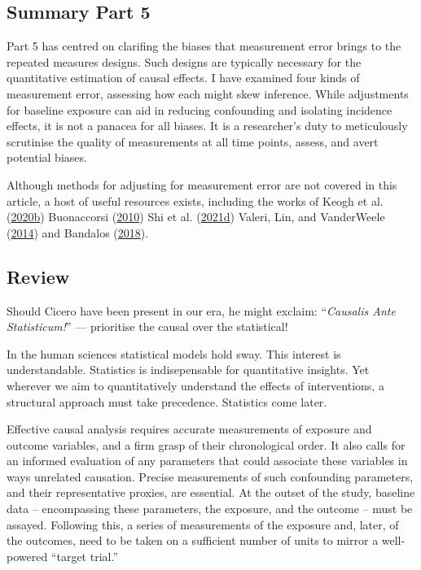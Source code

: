 \documentclass[
  singlecolumn]{report}
\begin{document}
\hypertarget{summary-part-5}{%
\subsection{Summary Part 5}\label{summary-part-5}}

Part 5 has centred on clarifing the biases that measurement error brings
to the repeated measures designs. Such designs are typically necessary
for the quantitative estimation of causal effects. I have examined four
kinds of measurement error, assessing how each might skew inference.
While adjustments for baseline exposure can aid in reducing confounding
and isolating incidence effects, it is not a panacea for all biases. It
is a researcher's duty to meticulously scrutinise the quality of
measurements at all time points, assess, and avert potential biases.

Although methods for adjusting for measurement error are not covered in
this article, a host of useful resources exists, including the works of
Keogh et al. (\protect\hyperlink{ref-keogh2020}{2020b}) Buonaccorsi
(\protect\hyperlink{ref-buonaccorsi2010}{2010}) Shi et al.
(\protect\hyperlink{ref-shi2021b}{2021d}) Valeri, Lin, and VanderWeele
(\protect\hyperlink{ref-valeri2014}{2014}) and Bandalos
(\protect\hyperlink{ref-bandalos2018}{2018}).

\hypertarget{review}{%
\subsection{Review}\label{review}}

Should Cicero have been present in our era, he might exclaim:
``\emph{Causalis Ante Statisticum!}'' --- prioritise the causal over the
statistical!

In the human sciences statistical models hold sway. This interest is
understandable. Statistics is indisepensable for quantitative insights.
Yet wherever we aim to quantitatively understand the effects of
interventions, a structural approach must take precedence. Statistics
come later.

Effective causal analysis requires accurate measurements of exposure and
outcome variables, and a firm grasp of their chronological order. It
also calls for an informed evaluation of any parameters that could
associate these variables in ways unrelated causation. Precise
measurements of such confounding parameters, and their representative
proxies, are essential. At the outset of the study, baseline data --
encompassing these parameters, the exposure, and the outcome -- must be
assayed. Following this, a series of measurements of the exposure and,
later, of the outcomes, need to be taken on a sufficient number of units
to mirror a well-powered ``target trial.''
\end{document}
